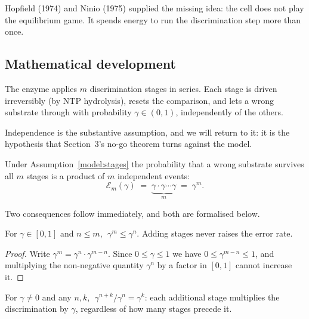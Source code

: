 Hopfield (1974) and Ninio (1975) supplied the missing idea: the cell does not
play the equilibrium game. It spends energy to run the discrimination step more
than once.

\subsection{Mathematical development}

\begin{model}\label{model:stages}
The enzyme applies $m$ discrimination stages in series. Each stage is driven
irreversibly (by NTP hydrolysis), resets the comparison, and lets a wrong
substrate through with probability $\gamma \in (0,1)$, independently of the others.
\end{model}

Independence is the substantive assumption, and we will return to it: it is the
hypothesis that Section~3's no-go theorem turns against the model.

Under Assumption~\ref{model:stages} the probability that a wrong substrate
survives all $m$ stages is a product of $m$ independent events:
\begin{equation}\label{eq:cascade}
  \mathcal{E}_m(\gamma) \;=\; \underbrace{\gamma \cdot \gamma \cdots \gamma}_{m} \;=\; \gamma^m .
\end{equation}

Two consequences follow immediately, and both are formalised below.

\begin{proposition}[Monotonicity]\label{prop:antitone}
For $\gamma \in [0,1]$ and $n \le m$, $\;\gamma^m \le \gamma^n$. Adding stages
never raises the error rate.
\end{proposition}

\begin{proof}
Write $\gamma^m = \gamma^n \cdot \gamma^{m-n}$. Since $0 \le \gamma \le 1$ we have
$0 \le \gamma^{m-n} \le 1$, and multiplying the non-negative quantity $\gamma^n$
by a factor in $[0,1]$ cannot increase it.
\end{proof}

\begin{proposition}\label{prop:gain}
For $\gamma \ne 0$ and any $n, k$, $\;\gamma^{n+k}/\gamma^{n} = \gamma^{k}$: each
additional stage multiplies the discrimination by $\gamma$, regardless of how
many stages precede it.
\end{proposition}


